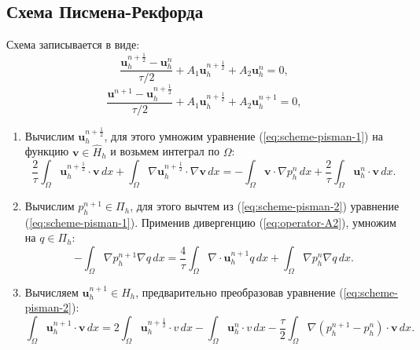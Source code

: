 \documentclass[12pt]{article}
\begin{document}
\subsection{Схема Писмена-Рекфорда} 
Схема записывается в виде:
\begin{equation} \label{eq:scheme-pisman-1}
\frac{{\bm u}_h^{n+\frac{1}{2}}-{\bm u}_h^n}{\tau/2} + A_1 {\bm u}_h^{n+\frac{1}{2}}+A_2 {\bm u}_h^n=0,
\end{equation}
\begin{equation} \label{eq:scheme-pisman-2}
\frac{{\bm u}^{n+1}-{\bm u}_h^{n+\frac{1}{2}}}{\tau/2} + A_1 {\bm u}_h^{n+\frac{1}{2}}+ A_2 {\bm u}_h^{n+1}=0,
\end{equation}
\begin{enumerate}
\item 
Вычислим ${\bm u}_h^{n+\frac{1}{2}}$, для этого умножим уравнение (\ref{eq:scheme-pisman-1}) на функцию ${\bm v} \in \hat H_h$ и возьмем интеграл по $\Omega$:
$$
\frac{2}{\tau}\int_{\Omega} {\bm u}_h^{n+\frac{1}{2}}\cdot {\bm v} \,dx + \int_{\Omega} \nabla {\bm u}_h^{n+\frac{1}{2}} \cdot \nabla {\bm v} \,dx = -\int_{\Omega} {\bm v} \cdot \nabla p_h^{n}\, dx + \frac{2}{\tau} \int_{\Omega} {\bm u}_h^{n} \cdot {\bm v} \,dx.
$$
\item 
Вычислим $p_h^{n+1} \in \Pi_h$, для этого вычтем из (\ref{eq:scheme-pisman-2}) уравнение (\ref{eq:scheme-pisman-1}). Применив дивергенцию (\ref{eq:operator-A2}), умножим на $q \in \Pi_h$:
$$
-\int_{\Omega} \nabla p_h^{n+1} \nabla q \,dx = \frac{4}{\tau} \int_{\Omega} \nabla \cdot {\bm u}_h^{n+1} q \,dx + \int_{\Omega} \nabla p_h^{n} \nabla q \,dx.
$$
\item 
Вычисляем ${\bm u}_h^{n+1} \in H_h$, предварительно преобразовав уравнение (\ref{eq:scheme-pisman-2}):
$$
\int_{\Omega} {\bm u}_h^{n+1} \cdot {\bm v}\,dx =  2 \int_{\Omega} {\bm u}_h^{n+\frac{1}{2}} \cdot v \,dx - \int_{\Omega} {\bm u}_h^n \cdot v \,dx - \frac{\tau}{2} \int_{\Omega} \nabla (p_h^{n+1} - p_h^n) \cdot {\bm v} \,dx.
$$
\end{enumerate}
\end{document}
